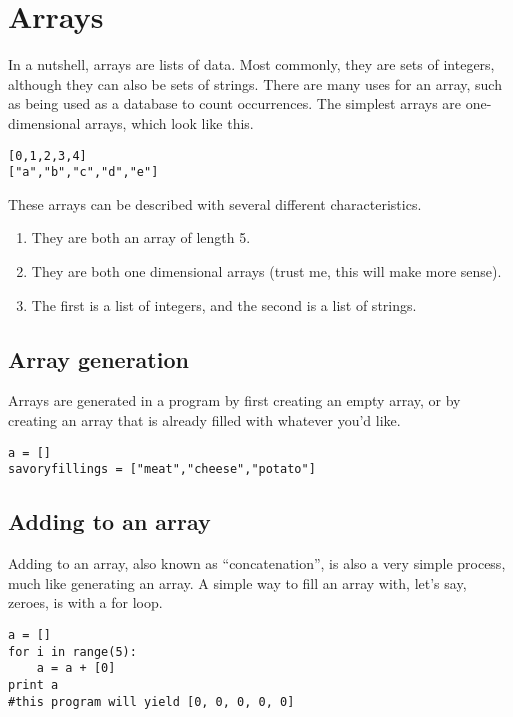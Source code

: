 \chapter{Arrays}

In a nutshell, arrays are lists of data. Most commonly, they are sets of integers, although they can also be sets of strings. There are many uses for an array, such as being used as a database to count occurrences. The simplest arrays are one-dimensional arrays, which look like this.

\begin{verbatim}
[0,1,2,3,4]
["a","b","c","d","e"]
\end{verbatim}


These arrays can be described with several different characteristics.
\begin{enumerate}
\item They are both an array of length 5.
\item They are both one dimensional arrays (trust me, this will make more
sense).
\item The first is a list of integers, and the second is a list of strings.
\end{enumerate}

\section{Array generation}

Arrays are generated in a program by first creating an empty array, or by creating an array that is already filled with whatever you'd like.

\begin{verbatim}
a = []
savoryfillings = ["meat","cheese","potato"]
\end{verbatim}



\section{Adding to an array}

Adding to an array, also known as ``concatenation'', is also a very simple process, much like generating an array. A simple way to fill an array with, let's say, zeroes, is with a for loop.

\begin{verbatim}
a = []
for i in range(5):
	a = a + [0]
print a
#this program will yield [0, 0, 0, 0, 0]
\end{verbatim}


